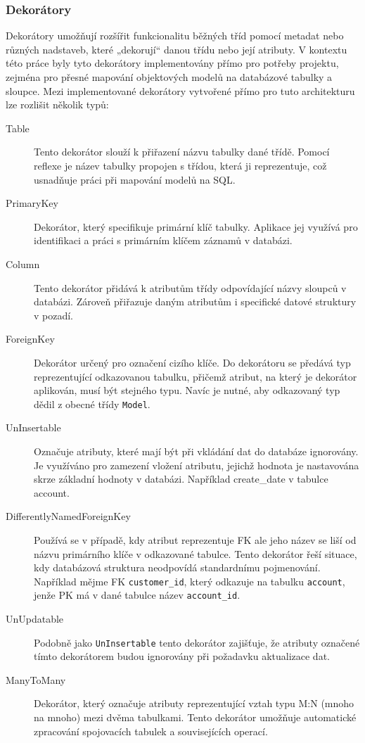 \subsubsection{Dekorátory}
Dekorátory umožňují rozšířit funkcionalitu běžných tříd pomocí metadat nebo různých nadstaveb, které „dekorují“ danou třídu nebo její atributy\cite{TSDecorators}. V kontextu této práce byly tyto dekorátory implementovány přímo pro potřeby projektu, zejména pro přesné mapování objektových modelů na databázové tabulky a sloupce. Mezi implementované dekorátory vytvořené přímo pro tuto architekturu lze rozlišit několik typů:
\begin{description}
    \item[Table] 
    Tento dekorátor slouží k přiřazení názvu tabulky dané třídě. Pomocí reflexe je název tabulky propojen s třídou, která ji reprezentuje, což usnadňuje práci při mapování modelů na SQL.
    \item[PrimaryKey]  
Dekorátor, který specifikuje primární klíč tabulky. Aplikace jej využívá pro identifikaci a práci s primárním klíčem záznamů v databázi.

\item[Column] 
Tento dekorátor přidává k atributům třídy odpovídající názvy sloupců v databázi. Zároveň přiřazuje daným atributům i specifické datové struktury v pozadí.

\item[ForeignKey] 
Dekorátor určený pro označení cizího klíče. Do dekorátoru se předává typ reprezentující odkazovanou tabulku, přičemž atribut, na který je dekorátor aplikován, musí být stejného typu. Navíc je nutné, aby odkazovaný typ dědil z obecné třídy \texttt{Model}.

\item[UnInsertable]
Označuje atributy, které mají být při vkládání dat do databáze ignorovány. Je využíváno pro zamezení vložení atributu, jejichž hodnota je nastavována skrze základní hodnoty v databázi. Například create\_date v tabulce account.

\item[DifferentlyNamedForeignKey]  
Používá se v případě, kdy atribut reprezentuje FK ale jeho název se liší od názvu primárního klíče v odkazované tabulce. Tento dekorátor řeší situace, kdy databázová struktura neodpovídá standardnímu pojmenování. Například mějme FK \texttt{customer\_id}, který odkazuje na tabulku \texttt{account}, jenže PK má v dané tabulce název \texttt{account\_id}.

\item[UnUpdatable]  
Podobně jako \texttt{UnInsertable} tento dekorátor zajišťuje, že atributy označené tímto dekorátorem budou ignorovány při požadavku aktualizace dat.

\item[ManyToMany]
Dekorátor, který označuje atributy reprezentující vztah typu M:N (mnoho na mnoho) mezi dvěma tabulkami. Tento dekorátor umožňuje automatické zpracování spojovacích tabulek a souvisejících operací.
\end{description}